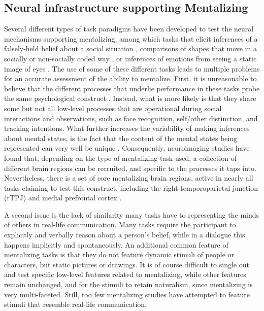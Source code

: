 \subsection*{Neural infrastructure supporting Mentalizing}

Several different types of task paradigms have been developed to test the neural mechanisms supporting mentalizing, among which tasks that elicit inferences of a falsely-held belief about a social situation \citep[False Belief task; ][]{baron-cohen1985}, comparisons of shapes that move in a socially or non-socially coded way \citep[Social Animations task; ][]{castelli2002}, or inferences of emotions from seeing a static image of eyes \citep[Reading the Mind in the Eyes task, or RMET; ][]{baron-cohen2001RMET}. The use of some of these different tasks leads to multiple problems for an accurate assessment of the ability to mentalize. First, it is unreasonable to believe that the different processes that underlie performance in these tasks probe the same psychological construct \citep{schaafsma2015}. Instead, what is more likely is that they share some but not all low-level processes that are operational during social interactions and observations, such as face recognition, self/other distinction, and tracking intentions. What further increases the variability of making inferences about mental states, is the fact that the content of the mental states being represented can very well be unique \citep{conway2019}. Consequently, neuroimaging studies have found that, depending on the type of mentalizing task used, a collection of different brain regions can be recruited, and specific to the processes it taps into. Nevertheless, there is a set of core mentalizing brain regions, active in nearly all tasks claiming to test this construct, including the right temporoparietal junction (rTPJ) and medial prefrontal cortex \citep[mPFC; ][]{schurz2014}. 


A second issue is the lack of similarity many tasks have to representing the minds of others in real-life communication. Many tasks require the participant to explicitly and verbally reason about a person's belief, while in a dialogue this happens implicitly and spontaneously. An additional common feature of mentalizing tasks is that they do not feature dynamic stimuli of people or characters, but static pictures or drawings. It is of course difficult to single out and test specific low-level features related to mentalizing, while other features remain unchanged, and for the stimuli to retain naturalism, since mentalizing is very multi-faceted. Still, too few mentalizing studies have attempted to feature stimuli that resemble real-life communication.

